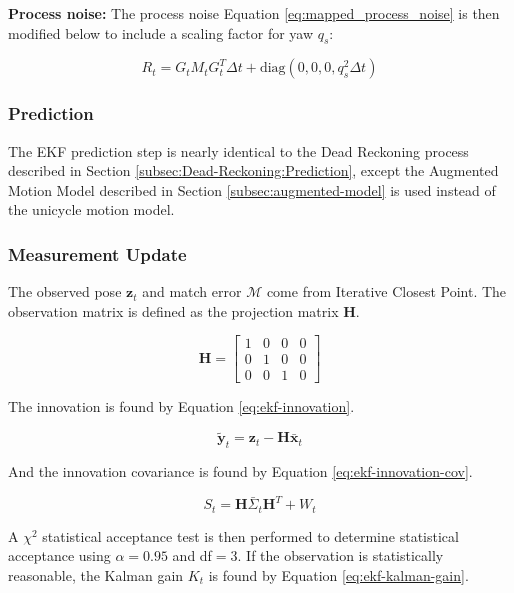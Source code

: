 \textbf{Process noise:} The process noise Equation \ref{eq:mapped_process_noise} is then modified below to include a scaling factor for yaw $q_s$:

\begin{equation} \label{eq:mapped_process_noise_augmented}
    R_t = G_t M_t G_t^T \Delta t + \text{diag}(0,0,0,q_s^2 \Delta t)
\end{equation}

\subsubsection{Prediction}

The EKF prediction step is nearly identical to the Dead Reckoning process described in Section \ref{subsec:Dead-Reckoning:Prediction}, except the Augmented Motion Model described in Section \ref{subsec:augmented-model} is used instead of the unicycle motion model.

\subsubsection{Measurement Update}
The observed pose $\textbf{z}_t$ and match error $\mathcal{M}$ come from Iterative Closest Point.
The observation matrix is defined as the projection matrix $\textbf{H}$.

\begin{equation}
    \textbf{H} = \begin{bmatrix}
        1 & 0 & 0 & 0 \\
        0 & 1 & 0 & 0 \\
        0 & 0 & 1 & 0
    \end{bmatrix}
\end{equation}

The innovation is found by Equation \ref{eq:ekf-innovation}.

\begin{equation}\label{eq:ekf-innovation}
    \tilde{\textbf{y}}_t = \textbf{z}_t - \textbf{H} \bar{\textbf{x}}_t
\end{equation}

And the innovation covariance is found by Equation \ref{eq:ekf-innovation-cov}.

\begin{equation}\label{eq:ekf-innovation-cov}
    S_t = \textbf{H} \bar{\Sigma}_t \textbf{H}^T + W_t
\end{equation}

A $\chi^2$ statistical acceptance test is then performed to determine statistical acceptance using $\alpha=0.95$ and df$=3$.
If the observation is statistically reasonable, the Kalman gain $K_t$ is found by Equation \ref{eq:ekf-kalman-gain}.

